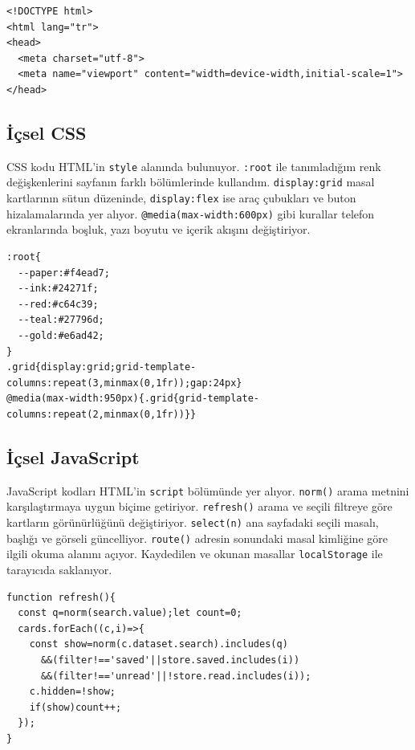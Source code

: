 \documentclass[12pt,a4paper]{article}
\begin{document}
\begin{lstlisting}[caption={HTML belgesinin baslangicindan kisa ornek}]
<!DOCTYPE html>
<html lang="tr">
<head>
  <meta charset="utf-8">
  <meta name="viewport" content="width=device-width,initial-scale=1">
</head>
\end{lstlisting}

\subsection{İçsel CSS}
CSS kodu HTML'in \texttt{style} alanında bulunuyor. \texttt{:root} ile tanımladığım renk değişkenlerini sayfanın farklı bölümlerinde kullandım. \texttt{display:grid} masal kartlarının sütun düzeninde, \texttt{display:flex} ise araç çubukları ve buton hizalamalarında yer alıyor. \texttt{@media(max-width:600px)} gibi kurallar telefon ekranlarında boşluk, yazı boyutu ve içerik akışını değiştiriyor.

\begin{lstlisting}[caption={Gercek dosyadaki renk degiskenleri ve kart duzeni}]
:root{
  --paper:#f4ead7;
  --ink:#24271f;
  --red:#c64c39;
  --teal:#27796d;
  --gold:#e6ad42;
}
.grid{display:grid;grid-template-columns:repeat(3,minmax(0,1fr));gap:24px}
@media(max-width:950px){.grid{grid-template-columns:repeat(2,minmax(0,1fr))}}
\end{lstlisting}

\subsection{İçsel JavaScript}
JavaScript kodları HTML'in \texttt{script} bölümünde yer alıyor. \texttt{norm()} arama metnini karşılaştırmaya uygun biçime getiriyor. \texttt{refresh()} arama ve seçili filtreye göre kartların görünürlüğünü değiştiriyor. \texttt{select(n)} ana sayfadaki seçili masalı, başlığı ve görseli güncelliyor. \texttt{route()} adresin sonundaki masal kimliğine göre ilgili okuma alanını açıyor. Kaydedilen ve okunan masallar \texttt{localStorage} ile tarayıcıda saklanıyor.

\begin{lstlisting}[caption={Arama ve filtre isleminin gercek JavaScript kodundan alinti}]
function refresh(){
  const q=norm(search.value);let count=0;
  cards.forEach((c,i)=>{
    const show=norm(c.dataset.search).includes(q)
      &&(filter!=='saved'||store.saved.includes(i))
      &&(filter!=='unread'||!store.read.includes(i));
    c.hidden=!show;
    if(show)count++;
  });
}
\end{lstlisting}
\end{document}
